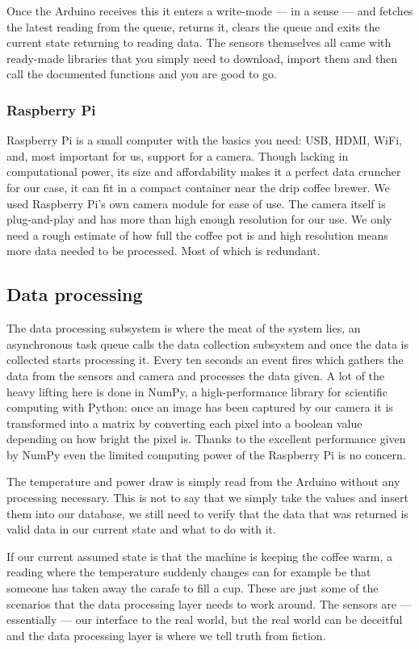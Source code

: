 \documentclass[12pt,a4paper,oneside,article]{memoir}
\numberwithin{equation}{chapter}
\begin{document}
Once the Arduino receives this it enters a write-mode --- in a sense --- and
fetches the latest reading from the queue, returns it, clears the queue and
exits the current state returning to reading data. The sensors themselves all
came with ready-made libraries that you simply need to download, import them and
then call the documented functions and you are good to go.

\subsubsection{Raspberry Pi}\label{sec:raspberry-pi}
Raspberry Pi is a small computer with the basics you need: USB, HDMI, WiFi, and,
most important for us, support for a camera. Though lacking in computational
power, its size and affordability makes it a perfect data cruncher for our case,
it can fit in a compact container near the drip coffee brewer. We used Raspberry
Pi's own camera module for ease of use. The camera itself is plug-and-play and
has more than high enough resolution for our use. We only need a rough estimate
of how full the coffee pot is and high resolution means more data needed to be
processed. Most of which is redundant.

\subsection{Data processing}\label{sec:data-processing}
The data processing subsystem is where the meat of the system lies, an
asynchronous task queue calls the data collection subsystem and once the data is
collected starts processing it. Every ten seconds an event fires which gathers
the data from the sensors and camera and processes the data given. A lot of the
heavy lifting here is done in NumPy, a high-performance library for scientific
computing with Python: once an image has been captured by our camera it is
transformed into a matrix by converting each pixel into a boolean value
depending on how bright the pixel is. Thanks to the excellent performance given
by NumPy even the limited computing power of the Raspberry Pi is no concern.

The temperature and power draw is simply read from the Arduino without any
processing necessary. This is not to say that we simply take the values and
insert them into our database, we still need to verify that the data that was
returned is valid data in our current state and what to do with it.

If our current assumed state is that the machine is keeping the coffee warm, a
reading where the temperature suddenly changes can for example be that someone
has taken away the carafe to fill a cup. These are just some of the scenarios
that the data processing layer needs to work around. The sensors are ---
essentially --- our interface to the real world, but the real world can be
deceitful and the data processing layer is where we tell truth from fiction.
\end{document}
